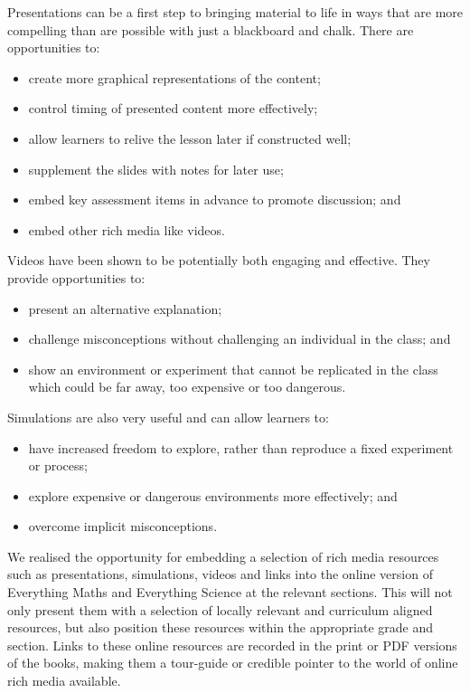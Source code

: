 Presentations can be a first step to bringing material to life in ways that are more compelling than are possible with just a blackboard and chalk. There are opportunities to:
\begin{itemize}
\item create more graphical representations of the content;
\item control timing of presented content more effectively;
\item allow learners to relive the lesson later if constructed well;
 \item supplement the slides with notes for later use;
\item embed key assessment items in advance to promote discussion; and
\item embed other rich media like videos.
\end{itemize}
Videos have been shown to be potentially both engaging and effective. They provide opportunities to:
\begin{itemize}
\item present an alternative explanation;
\item challenge misconceptions without challenging an individual in the class; and
\item show an environment or experiment that cannot be replicated in the class which could be far away, too expensive or too dangerous.
\end{itemize}
Simulations are also very useful and can allow learners to:
\begin{itemize}
\item have increased freedom to explore, rather than reproduce a fixed experiment or process;
\item explore expensive or dangerous environments more effectively; and
\item overcome implicit misconceptions.
\end{itemize}
We realised the opportunity for embedding a selection of rich media resources such as presentations, simulations, videos and links into the online version of Everything Maths and Everything Science at the relevant sections. This will not only present them with a selection of locally relevant and curriculum aligned resources, but also position these resources within the appropriate grade and section. Links to these online resources are recorded in the print or PDF versions of the  books, making them a tour-guide or credible pointer to the world of online rich media available. \par
